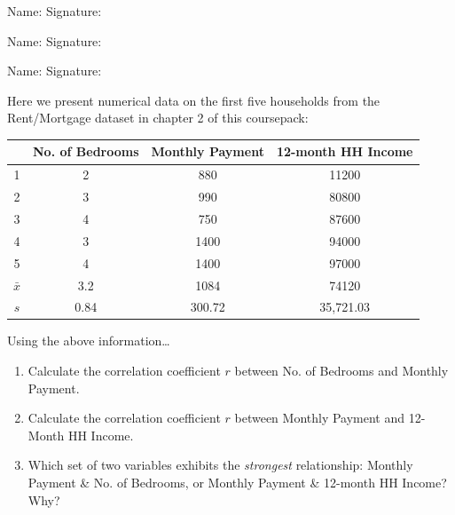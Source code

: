 \documentclass[11pt, chapterprefix=true]{scrbook}\usepackage[]{graphicx}\usepackage[]{color}
\begin{document}
\begin{exercises}
\begin{exercise}
\begin{center}
{{\vspace{4mm}
Name: \underline{\phantom{xxxxxxxxxxxxxxxxxxxxxxxx}} Signature: \underline{\phantom{xxxxxxxxxxxxxxxxxxxxxxxx}}

\vspace{4mm}
Name: \underline{\phantom{xxxxxxxxxxxxxxxxxxxxxxxx}} Signature: \underline{\phantom{xxxxxxxxxxxxxxxxxxxxxxxx}}

\vspace{4mm}
Name: \underline{\phantom{xxxxxxxxxxxxxxxxxxxxxxxx}} Signature: \underline{\phantom{xxxxxxxxxxxxxxxxxxxxxxxx}}
 }}
\end{center}

Here we present numerical data on the first five households from the Rent/Mortgage dataset in chapter 2 of this coursepack:

\begin{center}
\begin{tabular}{@{} cccc @{}} \hline
	& No. of Bedrooms	& Monthly Payment &	12-month HH Income \\ \hline
1 &	2 &	880 &	11200 \\
2 &	3	& 990 &	80800 \\
3 &	4 &	750 &	87600 \\
4 &	3	& 1400 & 94000 \\
5 &	4	& 1400 & 97000 \\ \hline
$\bar{x}$ & 3.2  & 1084   & 74120 \\
$s$       & 0.84 & 300.72 & 35,721.03 \\ \hline
\end{tabular}
\end{center}

Using the above information…

\begin{enumerate}
  \item Calculate the correlation coefficient $r$ between No. of Bedrooms and Monthly Payment.
	\item Calculate the correlation coefficient $r$ between Monthly Payment and 12-Month HH Income.
  \item Which set of two variables exhibits the \textit{strongest} relationship: Monthly Payment \& No. of Bedrooms, or Monthly Payment \& 12-month HH Income? Why?
\end{enumerate}

\end{exercise}
\begin{solution}  %

\end{solution}



\end{exercises}
\end{document}
